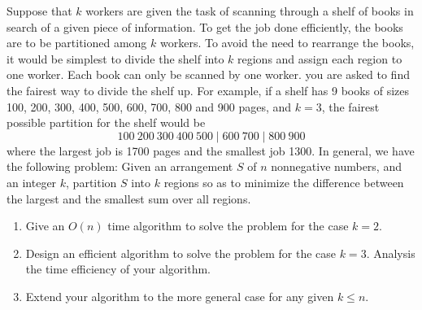 \begin{refsection}
\begin{Exercise}
Suppose that $k$ workers are given the task of scanning through a shelf of books in search of a given piece of information. To get the job done efficiently, the books are to be partitioned among $k$ workers. To avoid the need to rearrange the books, it would be simplest to divide the shelf into $k$ regions and assign each region to one worker. Each book can only be scanned by one worker. you are asked to find the fairest way to divide the shelf up. For example, if a shelf has 9 books of sizes 100, 200, 300, 400, 500, 600, 700, 800 and 900 pages, and $k = 3$, the fairest possible partition for the shelf would be
\[ 100~200~300~400~500 \mid 600~700 \mid 800~900 \]
where the largest job is 1700 pages and the smallest job 1300. In general, we have the following problem: Given an arrangement $S$ of $n$ nonnegative numbers, and an integer $k$, partition $S$ into $k$ regions so as to minimize the difference between the largest and the smallest sum over all regions.

\begin{enumerate}
\item Give an $O(n)$ time algorithm to solve the problem for the case $k = 2$.
\item Design an efficient algorithm to solve the problem for the case $k = 3$. Analysis the time efficiency of your algorithm.
\item Extend your algorithm to the more general case for any given $k \leq n$. 
\end{enumerate}
\end{Exercise}
\begin{Answer}
\end{Answer}

\printbibliography[heading=subbibliography]
\end{refsection}
